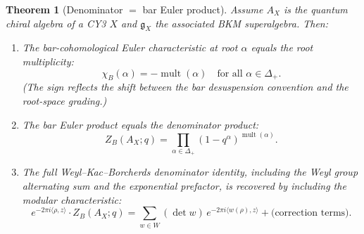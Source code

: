 \documentclass[11pt]{amsart}
\newtheorem{theorem}{Theorem}[section]
\theoremstyle{definition}
\theoremstyle{remark}
\DeclareMathOperator{\mult}{mult}
\newcommand{\fg}{\mathfrak{g}}
\begin{document}
\begin{theorem}[Denominator $=$ bar Euler product]
\label{thm:denom-bar}
Assume $A_X$ is the quantum chiral algebra of a CY3 $X$ and
$\fg_X$ the associated BKM superalgebra. Then:
\begin{enumerate}[label=(\roman*)]
 \item The bar-cohomological Euler characteristic at root
 $\alpha$ equals the root multiplicity:
 \begin{equation}\label{eq:chi-mult}
 \chi_B(\alpha) = -\mult(\alpha)
 \quad \text{for all } \alpha \in \Delta_+.
 \end{equation}
 (The sign reflects the shift between the bar desuspension
 convention and the root-space grading.)

 \item The bar Euler product equals the denominator product:
 \begin{equation}\label{eq:euler-denom}
 Z_B(A_X; q) = \prod_{\alpha \in \Delta_+}
 (1 - q^\alpha)^{\mult(\alpha)}.
 \end{equation}

 \item The full Weyl--Kac--Borcherds denominator identity,
 including the Weyl group alternating sum and the
 exponential prefactor, is recovered by including the modular
 characteristic:
 \begin{equation}\label{eq:full-denom}
 e^{-2\pi i \langle \rho, z \rangle} \cdot Z_B(A_X; q)
 = \sum_{w \in W} (\det w)\, e^{-2\pi i
 \langle w(\rho), z \rangle} + \text{(correction terms)}.
 \end{equation}
\end{enumerate}
\end{theorem}
\end{document}
